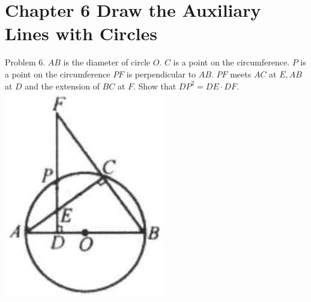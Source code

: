 \documentclass[10pt]{article}
\begin{document}
\section*{Chapter 6 Draw the Auxiliary Lines with Circles}
Problem 6. \(A B\) is the diameter of circle \(O\). \(C\) is a point on the circumference. \(P\) is a point on the circumference \(P F\) is perpendicular to \(A B\). \(P F\) meets \(A C\) at \(E, A B\) at \(D\) and the extension of \(B C\) at \(F\). Show that \(D P^{2}=D E \cdot D F\).\\
\includegraphics[max width=\textwidth, center]{2025_04_17_97bc1f7e44d93c271a88g-170(2)}
\end{document}
